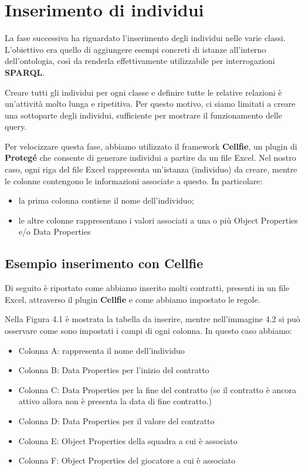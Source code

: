 \documentclass[11pt]{report} %
\begin{document}
\chapter{Inserimento di individui}
La fase successiva ha riguardato l'inserimento degli individui nelle varie classi. L'obiettivo era quello di aggiungere esempi concreti di istanze all'interno dell'ontologia, così da renderla effettivamente utilizzabile per interrogazioni \textbf{SPARQL}.

\hfill

Creare tutti gli individui per ogni classe e definire tutte le relative relazioni è un'attività molto lunga e ripetitiva. Per questo motivo, ci siamo limitati a creare una sottoparte degli individui, sufficiente per mostrare il funzionamento delle query.

\hfill

Per velocizzare questa fase, abbiamo utilizzato il framework \textbf{Cellfie}, un plugin di \textbf{Protegé} che consente di generare individui a partire da un file Excel.
Nel nostro caso, ogni riga del file Excel rappresenta un'istanza (individuo) da creare, mentre le colonne contengono le informazioni associate a questo. In particolare:

\begin{itemize}
    \item la prima colonna contiene il nome dell'individuo;
    \item le altre colonne rappresentano i valori associati a una o più Object Properties e/o Data Properties
\end{itemize}
\newpage
\section{Esempio inserimento con Cellfie}
Di seguito è riportato come abbiamo inserito molti contratti, presenti in un file Excel, attraverso il plugin \textbf{Cellfie} e come abbiamo impostato le regole.

\hfill

Nella Figura 4.1 è mostrata la tabella da inserire, mentre nell'immagine 4.2 si può osservare come sono impostati i campi di ogni colonna.
In questo caso abbiamo:
\begin{itemize}
    \item Colonna A: rappresenta il nome dell'individuo
    \item Colonna B: Data Properties per l'inizio del contratto
    \item Colonna C: Data Properties per la fine del contratto (se il contratto è ancora attivo allora non è presenta la data di fine contratto.)
    \item Colonna D: Data Properties per il valore del contratto
    \item Colonna E: Object Properties della squadra a cui è associato
    \item Colonna F: Object Properties del giocatore a cui è associato
\end{itemize}
\end{document}
